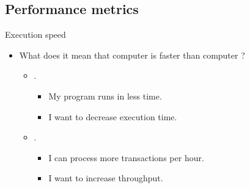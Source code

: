 \subsection{Performance metrics}

\begin{frame}[t]{Execution speed}
\begin{itemize}
  \item What does it mean that computer  
        is faster than computer ?

    \begin{itemize}
      \item {}.
        \begin{itemize}
          \item My program runs in less time.
          \item I want to decrease execution time.
        \end{itemize}

      \item {}.
        \begin{itemize}
          \item I can process more transactions per hour.
          \item I want to increase throughput.
        \end{itemize}
    \end{itemize}
\end{itemize}
\end{frame}

